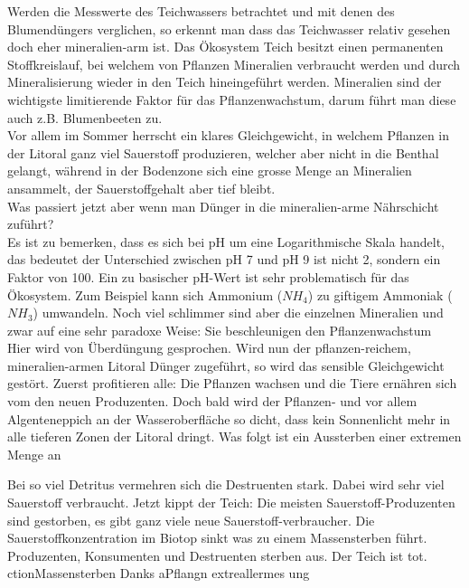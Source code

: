 \documentclass{article}
\begin{document}
        Werden die Messwerte des Teichwassers betrachtet und mit denen des Blumendüngers verglichen, so erkennt man dass das Teichwasser relativ gesehen doch eher mineralien-arm ist. Das Ökosystem Teich besitzt einen permanenten Stoffkreislauf, bei welchem von Pflanzen Mineralien verbraucht werden und durch Mineralisierung wieder in den Teich hineingeführt werden. Mineralien sind der wichtigste limitierende Faktor für das Pflanzenwachstum, darum führt man diese auch z.B. Blumenbeeten zu. \\
        Vor allem im Sommer herrscht ein klares Gleichgewicht, in welchem Pflanzen in der Litoral ganz viel Sauerstoff produzieren, welcher aber nicht in die Benthal gelangt, während in der Bodenzone sich eine grosse Menge an Mineralien ansammelt, der Sauerstoffgehalt aber tief bleibt. \\
        Was passiert jetzt aber wenn man Dünger in die mineralien-arme Nährschicht zuführt? \\
        Es ist zu bemerken, dass es sich bei pH um eine Logarithmische Skala handelt, das bedeutet der Unterschied zwischen pH 7 und pH 9 ist nicht 2, sondern ein Faktor von 100. Ein zu basischer pH-Wert ist sehr problematisch für das Ökosystem. Zum Beispiel kann sich Ammonium ($NH_4$) zu giftigem Ammoniak ($NH_3$) umwandeln.\cite{Teichpflege} Noch viel schlimmer sind aber die einzelnen Mineralien und zwar auf eine sehr paradoxe Weise: Sie beschleunigen den Pflanzenwachstum \\
        \vspace{5mm}
        Hier wird von Überdüngung gesprochen. Wird nun der pflanzen-reichem, mineralien-armen Litoral Dünger zugeführt, so wird das sensible Gleichgewicht gestört. Zuerst profitieren alle: Die Pflanzen wachsen und die Tiere ernähren sich vom den neuen Produzenten. Doch bald wird der Pflanzen- und vor allem Algenteneppich an der Wasseroberfläche so dicht, dass kein Sonnenlicht mehr in alle tieferen Zonen der Litoral dringt. Was folgt ist ein Aussterben einer extremen Menge an 

 Bei so viel Detritus vermehren sich die Destruenten stark. Dabei wird sehr viel Sauerstoff verbraucht. Jetzt kippt der Teich: Die meisten Sauerstoff-Produzenten sind gestorben, es gibt ganz viele neue Sauerstoff-verbraucher. Die Sauerstoffkonzentration im Biotop sinkt was zu einem Massensterben führt. Produzenten, Konsumenten und Destruenten sterben aus. Der Teich ist tot. \\
        \vspace{5mm}ction{Massensterben Danks aPflangn extreallermes ung}
\end{document}
